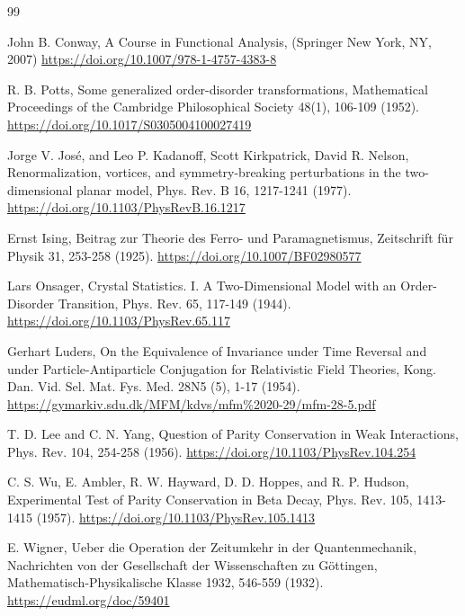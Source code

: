 \documentclass[12pt,a4paper]{article}
\begin{document}
\begin{thebibliography}{99}
	
	John B. Conway,
	A Course in Functional Analysis,
	(Springer New York, NY, 2007)
	\url{https://doi.org/10.1007/978-1-4757-4383-8}	
	
	
	R. B. Potts,  
	Some generalized order-disorder transformations,  
	Mathematical Proceedings of the Cambridge Philosophical Society 48(1), 106-109 (1952).  
	\url{https://doi.org/10.1017/S0305004100027419}  
	
	
	Jorge V. José, and Leo P. Kadanoff, Scott Kirkpatrick, David R. Nelson,
	Renormalization, vortices, and symmetry-breaking perturbations in the two-dimensional planar model,  
	Phys. Rev. B 16, 1217-1241 (1977).  
	\url{https://doi.org/10.1103/PhysRevB.16.1217} 
	
	
	Ernst Ising,  
	Beitrag zur Theorie des Ferro- und Paramagnetismus,  
	Zeitschrift für Physik 31, 253-258 (1925).  
	\url{https://doi.org/10.1007/BF02980577}
	
	
	Lars Onsager,  
	Crystal Statistics. I. A Two-Dimensional Model with an Order-Disorder Transition,  
	Phys. Rev. 65, 117-149 (1944).  
	\url{https://doi.org/10.1103/PhysRev.65.117}
	
	
	Gerhart Luders,  
	On the Equivalence of Invariance under Time Reversal and under Particle-Antiparticle Conjugation for Relativistic Field Theories,  
	Kong. Dan. Vid. Sel. Mat. Fys. Med. 28N5 (5), 1-17 (1954).
	\url{https://gymarkiv.sdu.dk/MFM/kdvs/mfm%2020-29/mfm-28-5.pdf}
	
	
	
	T. D. Lee and C. N. Yang,  
	Question of Parity Conservation in Weak Interactions,  
	Phys. Rev. 104, 254-258 (1956).  
	\url{https://doi.org/10.1103/PhysRev.104.254}
	
	
	C. S. Wu, E. Ambler, R. W. Hayward, D. D. Hoppes, and R. P. Hudson,
	Experimental Test of Parity Conservation in Beta Decay,  
	Phys. Rev. 105, 1413-1415 (1957).  
	\url{https://doi.org/10.1103/PhysRev.105.1413}
	
	
	
	E. Wigner, 
	Ueber die Operation der Zeitumkehr in der Quantenmechanik,
	Nachrichten von der Gesellschaft der Wissenschaften zu Göttingen, Mathematisch-Physikalische Klasse 1932, 546-559 (1932).
	\url{https://eudml.org/doc/59401}
	

\end{thebibliography}
\end{document}
